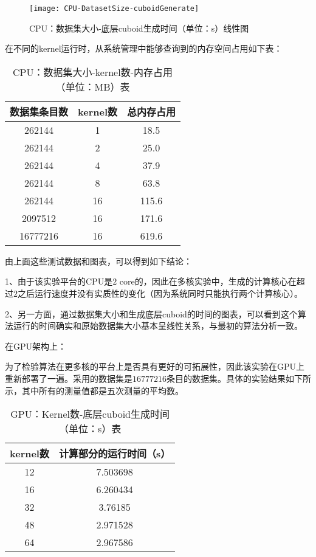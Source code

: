 \begin{figure}[ht]
\centering
\texttt{[image: CPU-DatasetSize-cuboidGenerate]}
\caption{CPU：数据集大小-底层cuboid生成时间（单位：s）线性图} 
\label{fig:figure2}
\end{figure}

在不同的kernel运行时，从系统管理中能够查询到的内存空间占用如下表：

\begin{table}[htbp]
\centering
\caption{CPU：数据集大小-kernel数-内存占用（单位：MB）表} 
\label{tab:table6}
\begin{tabular}{|c|c|c|}
    \hline
    数据集条目数 & kernel数 & 总内存占用\\
    \hline
    262144 & 1 & 18.5\\
    \hline
    262144 & 2 & 25.0\\
    \hline
    262144 & 4 & 37.9\\
    \hline
    262144 & 8 & 63.8\\
    \hline
    262144 & 16 & 115.6\\
    \hline
    2097512 & 16 & 171.6\\
    \hline
    16777216 & 16 & 619.6\\
    \hline
\end{tabular}
\end{table}

由上面这些测试数据和图表，可以得到如下结论：

1、由于该实验平台的CPU是$2$ core的，因此在多核实验中，生成的计算核心在超过$2$之后运行速度并没有实质性的变化（因为系统同时只能执行两个计算核心）。

2、另一方面，通过数据集大小和生成底层cuboid的时间的图表，可以看到这个算法运行的时间确实和原始数据集大小基本呈线性关系，与最初的算法分析一致。

在GPU架构上：

为了检验算法在更多核的平台上是否具有更好的可拓展性，因此该实验在GPU上重新部署了一遍。采用的数据集是$16777216$条目的数据集。具体的实验结果如下所示，其中所有的测量值都是五次测量的平均数。

\begin{table}[!htbp]
\centering
\caption{GPU：Kernel数-底层cuboid生成时间（单位：s）表} 
\label{tab:table7}
\begin{tabular}{|c|c|}
    \hline
    kernel数 & 计算部分的运行时间（s）\\
    \hline
    12 & 7.503698\\
    \hline
    16 & 6.260434\\
    \hline
    32 & 3.76185\\
    \hline
    48 & 2.971528\\
    \hline
    64 & 2.967586\\
    \hline
\end{tabular}
\end{table}

